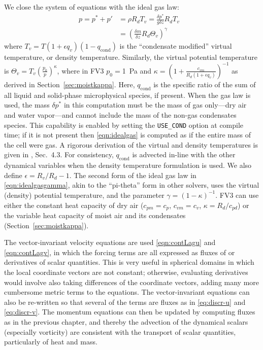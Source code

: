 \documentclass[10pt,letterpaper,margin=1in]{memoir}
\begin{document}
We close the system of equations with the ideal gas law:
\begin{subequations}
\begin{align}
 \label{eqn:idealgas}  p = p^* + p' & =  \rho R_d T_v = \frac{\delta p^*}{g\delta z}R_d T_v & \\
\label{eqn:idealgasgamma}   & =  \left ( \frac{\delta m}{\delta z}R_d \Theta_v \right )^{\gamma}   &
\end{align}
\end{subequations}
where $T_v = T \left ( 1 + \epsilon q_v\right )  \left ( 1 - q_\mathrm{cond} \right ) $ is the ``condensate modified'' virtual temperature, or density temperature. Similarly, the virtual potential temperature is  $\Theta_v = T_v \left(\frac{p_0}{p} \right)^\kappa $, where in FV3 $p_0 = $1~Pa and $\kappa = \left (1 + \frac{c_{vm}}{R_d \left ( 1 + \epsilon q_v\right )} \right )^{-1}$ as derived in Section~\ref{sec:moistkappa}.
Here, $q_{\mathrm{cond}}$ is the specific ratio of the sum of all liquid and solid-phase microphysical species, if present. When the gas law is used, the mass $\delta p^*$ in this computation must be the mass of gas only---dry air and water vapor---and cannot include the mass of the non-gas condensates species. This capability is enabled by setting the \texttt{USE_COND} option at compile time; if it is not present then \eqref{eqn:idealgas} is computed as if the entire mass of the cell were gas. A rigorous derivation of the virtual and density temperatures is given in \citet{Emanuel1994}, Sec.~4.3. For consistency, $q_\mathrm{cond}$ is advected in-line with the other dynamical variables when the density temperature formulation is used. We also define $\epsilon = R_v/R_d - 1$. 
The second form of the ideal gas law in \eqref{eqn:idealgasgamma}, akin to the ``pi-theta'' form in other solvers, uses the virtual (density) potential temperature, and the parameter $\gamma = (1-\kappa)^{-1}$. FV3 can use either the constant heat capacity of dry air ($c_{pm} = c_p$, $c_{vm} = c_v$, $\kappa = R_d/c_{pd}$) or the variable heat capacity of moist air and its condensates (Section~\ref{sec:moistkappa}).

The vector-invariant velocity equations are used \eqref{eqn:contLagu} and \eqref{eqn:contLagv}, in which the forcing terms are all expressed as fluxes of or derivatives of scalar quantities. This is very useful in spherical domains in which the local coordinate vectors are not constant; otherwise, evaluating derivatives would involve also taking differences of the coordinate vectors, adding many more cumbersome metric terms to the equations. The vector-invariant equations can also be re-written so that several of the terms are fluxes as in \eqref{eq:discr-u} and \eqref{eq:discr-v}. The momentum equations can then be updated by computing fluxes as in the previous chapter, and thereby the advection of the dynamical scalars (especially vorticity) are consistent with the transport of scalar quantities, particularly of heat and mass.
\end{document}
